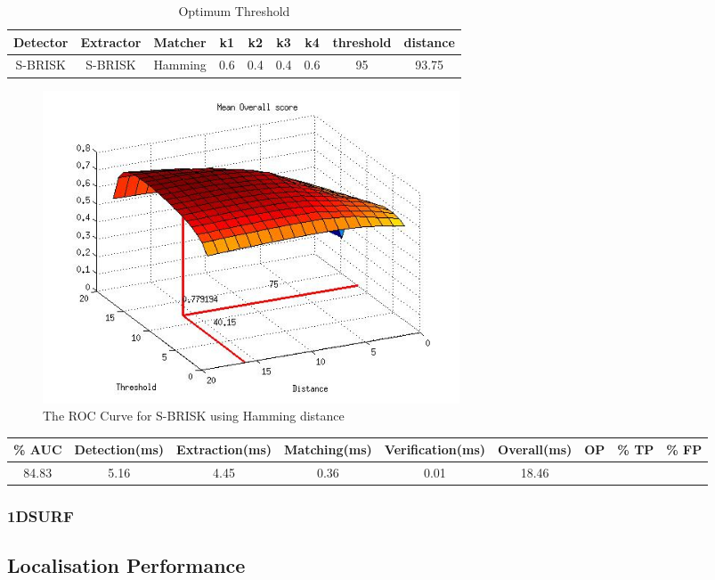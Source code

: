 \documentclass{article}
\begin{document}
\begin{table}
\caption{Optimum Threshold}
\begin{tabular}{|c|c|c|c|c|c|c|c|c|}
\hline 
Detector & Extractor & Matcher & k1 & k2 & k3 & k4 & threshold & distance\tabularnewline
\hline 
\hline 
S-BRISK & S-BRISK & Hamming & 0.6 & 0.4 & 0.4 & 0.6 & 95 & 93.75\tabularnewline
\hline 
\end{tabular}
\label{tab:sbrisk}
\end{table}

\begin{figure}[h!]
	\centering
		\includegraphics[width=0.6\textwidth]{../Drawings/ROC_SBRISK_SBRISK_Hamming.jpg}
	\caption{The ROC Curve for S-BRISK using Hamming distance}
	\label{fig:sbriskrocHamming}
\end{figure}


\begin{tabular}{|c|c|c|c|c|c|c|c|c|}
\hline 
\% AUC & Detection(ms) & Extraction(ms) & Matching(ms) & Verification(ms) & Overall(ms) & OP & \% TP & \% FP\tabularnewline
\hline 
\hline 
84.83 & 5.16 & 4.45 & 0.36 & 0.01 & 18.46 &  &  & \tabularnewline
\hline 
\end{tabular}




\subsubsection{1DSURF}
\label{sec:1dsurfResults}


\subsection{Localisation Performance}
\label{sec:localisationPerformance}
\end{document}
